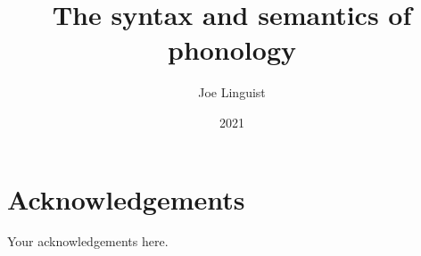 \documentclass[]{msu-thesis}
\title{The syntax and semantics of phonology}
\author{Joe Linguist}
\date{2021}
\begin{document}
\frontmatter
\maketitlepage


\begin{abstract}
\end{abstract}

\clearpage

\makecopyrightpage %

%
%
\clearpage
\chapter*{Acknowledgements}
\DoubleSpacing %
Your acknowledgements here.
%
\clearpage
\SingleSpacing
\tableofcontents* %
\clearpage
\listoftables %
\clearpage
\listoffigures %
%
%
%
\mainmatter
%
\end{document}
